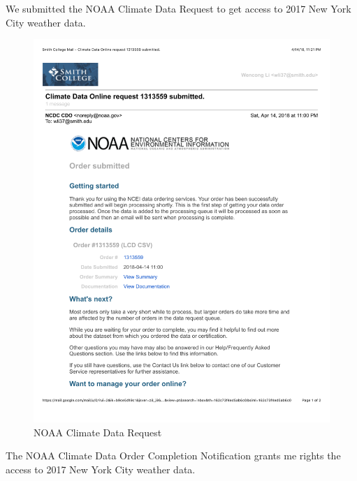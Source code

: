 \documentclass[12pt,twoside]{reedthesis}
\theoremstyle{definition}
\theoremstyle{definition}
\theoremstyle{definition}
\theoremstyle{remark}
\begin{document}
We submitted the NOAA Climate Data Request to get access to 2017 New
York City weather data.
\begin{figure}[h]

{\centering \includegraphics[width=5.8in]{figure/app_noaa_request} 

}

\caption{NOAA Climate Data Request}\label{fig:noaareq}
\end{figure}
The NOAA Climate Data Order Completion Notification grants me rights the
access to 2017 New York City weather data.
\end{document}
